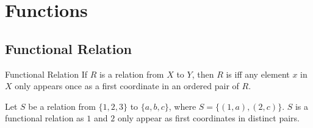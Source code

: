 \documentclass[../notes.tex]{subfiles}
\begin{document}
		\section{Functions}
			\subsection{Functional Relation}
				\begin{definition}{Functional Relation}
					If $R$ is a relation from $X$ to $Y$, then $R$ is  iff any element $x$ in $X$ only appears once as a first coordinate in an ordered pair of $R$.
				\end{definition}
				\begin{example}
					Let $S$ be a relation from $\{1, 2, 3\}$ to $\{a, b, c\}$, where $S = \bigl\{(1, a), (2, c)\bigr\}$. $S$ is a functional relation as $1$ and $2$ only appear as first coordinates in distinct pairs.
				\end{example}
\end{document}
